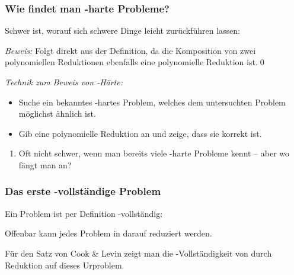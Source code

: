 \documentclass[aspectratio=1610,onlymath]{beamer}
\begin{document}
\begin{frame}\frametitle{Wie findet man -harte Probleme?}

Schwer ist, worauf sich schwere Dinge leicht zurückführen lassen:


\emph{Beweis:} Folgt direkt aus der Definition, da die Komposition von zwei polynomiellen Reduktionen ebenfalls eine
polynomielle Reduktion ist.\qed
\bigskip\pause

\emph{Technik zum Beweis von -Härte:}
\begin{itemize}
\item Suche ein bekanntes -hartes Problem, welches dem untersuchten Problem möglichst ähnlich ist.
\item Gib eine polynomielle Reduktion an und zeige, dass sie korrekt ist.
\end{itemize}
\begin{enumerate}[$\leadsto$]
\item Oft nicht schwer, wenn man bereits viele -harte Probleme kennt -- aber wo fängt man an?
\end{enumerate}

\end{frame}

\begin{frame}\frametitle{Das erste -vollständige Problem}

Ein Problem ist per Definition -vollständig:\\[1ex]


Offenbar kann jedes Problem in  darauf reduziert werden.
\bigskip

Für den Satz von Cook \& Levin zeigt man die -Vollständigkeit von  durch Reduktion auf dieses
Urproblem.

\end{frame}
\end{document}
